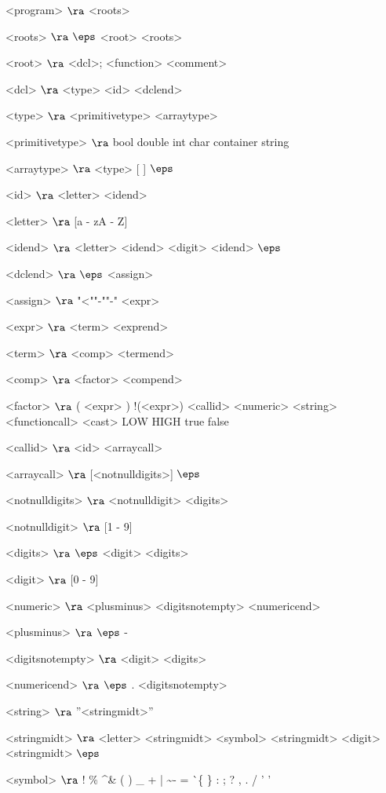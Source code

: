 \begin{grammar}
<program> $\ra$ <roots>

<roots> $\ra$ $\eps$
\alt <root> <roots>
 
<root> $\ra$ <dcl>;
\alt <function>
\alt <comment>

<dcl> $\ra$ <type> <id> <dclend>

<type> $\ra$ <primitivetype> <arraytype>

<primitivetype> $\ra$ bool
\alt double
\alt int
\alt char
\alt container
\alt string

<arraytype> $\ra$ <type> [ ]
\alt$\eps$

<id> $\ra$ <letter> <idend>

<letter> $\ra$ [a - zA - Z]

<idend> $\ra$ <letter> <idend>
	\alt <digit> <idend>
	\alt$\eps$

<dclend> $\ra$ $\eps$
\alt <assign> 

<assign> $\ra$ "<""-""-" <expr>

<expr> $\ra$ <term> <exprend>

<term> $\ra$ <comp> <termend>

<comp> $\ra$ <factor> <compend>

<factor> $\ra$ ( <expr> )
	\alt !(<expr>)
	\alt <callid>
	\alt <numeric>
	\alt <string>
	\alt <functioncall> 
	\alt <cast>
	\alt LOW
	\alt HIGH
	\alt true
	\alt false

<callid> $\ra$ <id> <arraycall>

<arraycall> $\ra$ [<notnulldigits>]
\alt$\eps$

<notnulldigits> $\ra$ <notnulldigit> <digits>

<notnulldigit> $\ra$ [1 - 9]

<digits> $\ra$ $\eps$
\alt <digit> <digits>

<digit> $\ra$ [0 - 9]

<numeric> $\ra$ <plusminus> <digitsnotempty> <numericend>

<plusminus> $\ra$ $\eps$
	\alt -

<digitsnotempty> $\ra$ <digit> <digits>

<numericend> $\ra$ $\eps$
\alt . <digitsnotempty>

<string> $\ra$ ''<stringmidt>''

<stringmidt> $\ra$ <letter> <stringmidt>
\alt <symbol> <stringmidt>
\alt <digit> <stringmidt>
\alt$\eps$

<symbol> $\ra$ !
\alt \%
\alt \^
\alt \&
\alt (
\alt )
\alt \_
\alt +
\alt |
\alt \~
\alt -
\alt =
\alt \`
\alt \{
\alt \}
\alt [
\alt ]
\alt :
\alt ;
\alt ?
\alt ,
\alt .
\alt /
\alt ' '


\end{grammar}
